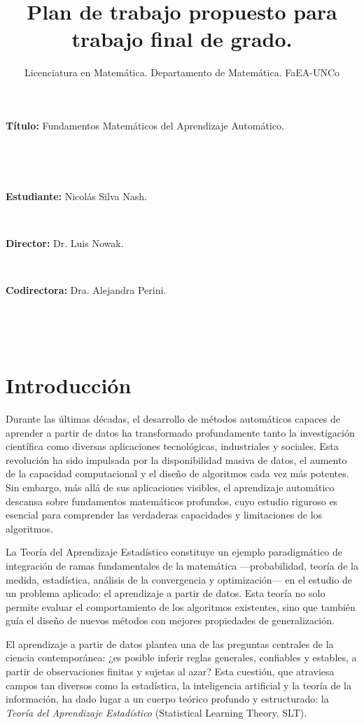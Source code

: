 \documentclass[12pt]{article}
\title{Plan de trabajo propuesto para trabajo final de grado.}
\author{Licenciatura en Matemática. Departamento de Matemática. FaEA-UNCo}
\date{}
\begin{document}
\maketitle


\noindent
{\large{\bf{Título:}}} Fundamentos Matemáticos del Aprendizaje Automático.

\

\

\noindent
{\large{\bf{Estudiante:}}} Nicolás Silva Nash.

\

\noindent
{\large{\bf{Director:}}} Dr. Luis Nowak.

\

\noindent
{\large{\bf{Codirectora:}}} Dra. Alejandra Perini.



\

\

\section*{Introducción}

Durante las últimas décadas, el desarrollo de métodos automáticos capaces de aprender a partir de datos ha transformado profundamente tanto la investigación científica como diversas aplicaciones tecnológicas, industriales y sociales. Esta revolución ha sido impulsada por la disponibilidad masiva de datos, el aumento de la capacidad computacional y el diseño de algoritmos cada vez más potentes. Sin embargo, más allá de sus aplicaciones visibles, el aprendizaje automático descansa sobre fundamentos matemáticos profundos, cuyo estudio riguroso es esencial para comprender las verdaderas capacidades y limitaciones de los algoritmos.

La Teoría del Aprendizaje Estadístico constituye un ejemplo paradigmático de integración de ramas fundamentales de la matemática —probabilidad, teoría de la medida, estadística, análisis de la convergencia y optimización— en el estudio de un problema aplicado: el aprendizaje a partir de datos. Esta teoría no solo permite evaluar el comportamiento de los algoritmos existentes, sino que también guía el diseño de nuevos métodos con mejores propiedades de generalización.

El aprendizaje a partir de datos plantea una de las preguntas centrales de la ciencia contemporánea: ¿es posible inferir reglas generales, confiables y estables, a partir de observaciones finitas y sujetas al azar? Esta cuestión, que atraviesa campos tan diversos como la estadística, la inteligencia artificial y la teoría de la información, ha dado lugar a un cuerpo teórico profundo y estructurado: la \textit{Teoría del Aprendizaje Estadístico} (Statistical Learning Theory, SLT).
\end{document}
